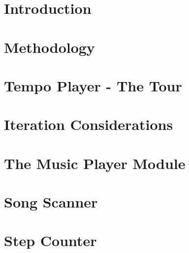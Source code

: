 



\frontmatter 

\cleardoublepage

\cleardoublepage

\cleardoublepage


\mainmatter



\chapter{Introduction}
\label{chap:intro}


\chapter{Methodology}
\label{chap:methodology}


\chapter{Tempo Player - The Tour}
\label{chap:tempoPlayer}


\chapter{Iteration Considerations}
\label{chap:iteration}


\chapter{The Music Player Module}
\label{chap:musicPlayer}


\chapter{Song Scanner}
\label{chap:songScanner}


\chapter{Step Counter}
\label{chap:stepCounter}


